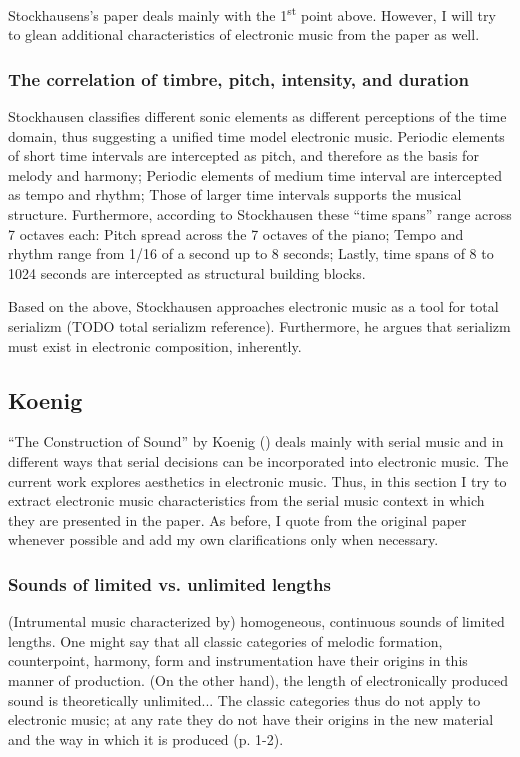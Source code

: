 \documentclass[a4paper,11pt]{article}
\newenvironment{MyShadequote}[1][]{%
    \ignorespaces%
    \begin{mdframed}[style=MyShadeQuoteStyle,#1]%
}{%
    \end{mdframed}%
    \ignorespacesafterend%
}%
\begin{document}
Stockhausens's paper deals mainly with the 1\textsuperscript{st} point above.
However, I will try to glean additional characteristics of electronic music from the paper as well.

\subsubsection{The correlation of timbre, pitch, intensity, and duration}
\label{subs:stockhausen:time}

Stockhausen classifies different sonic elements as different perceptions of the time domain, thus suggesting a unified time model electronic music.
Periodic elements of short time intervals are intercepted as pitch, and therefore as the basis for melody and harmony;
Periodic elements of medium time interval are intercepted as tempo and rhythm;
Those of larger time intervals supports the musical structure.
Furthermore, according to Stockhausen these ``time spans'' range across 7 octaves each:
Pitch spread across the 7 octaves of the piano;
Tempo and rhythm range from 1/16 of a second up to 8 seconds;
Lastly, time spans of 8 to 1024 seconds are intercepted as structural building blocks.

Based on the above, Stockhausen approaches electronic music as a tool for total serializm (TODO total serializm reference).
Furthermore, he argues that serializm must exist in electronic composition, inherently.

\subsection{Koenig}
\label{sub:eshtetic_koenig}

``The Construction of Sound'' by Koenig (\cite*{koenig}) deals mainly with serial music and in different ways that serial decisions can be incorporated into electronic music.
The current work explores aesthetics in electronic music.
Thus, in this section I try to extract electronic music characteristics from the serial music context in which they are presented in the paper.
As before, I quote from the original paper whenever possible and add my own clarifications only when necessary.

\subsubsection{Sounds of limited vs. unlimited lengths}
\label{subs:koenig:lengths}

\begin{MyShadequote}
  (Intrumental music characterized by) homogeneous, continuous sounds of limited lengths.
  One might say that all classic categories of melodic formation, counterpoint, harmony, form and instrumentation have their origins in this manner of production.
  (On the other hand), the length of electronically produced sound is theoretically unlimited...
  The classic categories thus do not apply to electronic music;
  at any rate they do not have their origins in the new material and the way in which it is produced (p. 1-2).
\end{MyShadequote}
\end{document}
